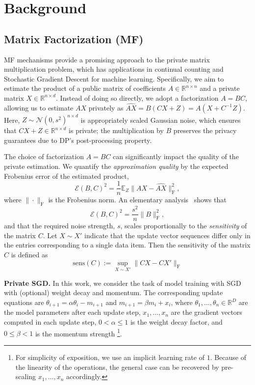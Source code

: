\documentclass{article} %
\newcommand{\R}{\mathbb{R}}
\begin{document}
\section{Background}
\label{sec:background}

\subsection{Matrix Factorization (MF)}
\label{sec:matrix_factorization}
MF mechanisms provide a promising approach to the private matrix multiplication problem, which has applications in continual counting and Stochastic Gradient Descent for machine learning. Specifically, we aim to estimate the product of a public matrix of coefficients $A \in \mathbb{R}^{n\times n}$ and a private matrix $X \in \mathbb{R}^{n \times d}$. Instead of doing so directly, we adopt a factorization $A = BC$, allowing us to estimate $AX$ privately as $\widehat{AX} = B(CX + Z) = A(X + C^{-1}Z)$. Here, $Z \sim \mathcal{N}(0, s^2)^{n \times d}$ is appropriately scaled Gaussian noise, which ensures that $CX + Z \in \mathbb R^{n \times d}$ is private; the multiplication by $B$ preserves the privacy guarantees due to DP's post-processing property. 

The choice of factorization $A = BC$ can significantly impact the quality of the private estimation.  %
%
We quantify the \emph{approximation quality} by the expected Frobenius error of the estimated product, 
\begin{equation}
\mathcal{E}(B,C)^2 = \frac{1}{n}\mathbb{E}_Z \|AX - \widehat{AX}\|_\mathrm{F}^2,\label{eq:approximation_error}
\end{equation}
where $\|\cdot\|_\mathrm{F}$ is the Frobenius norm. An elementary analysis~\citep{Li_MF} shows that 
\begin{equation}
    \mathcal{E}(B,C)^2 = \frac{s^2}{n} \|B\|^2_\mathrm{F},
\end{equation}
and that the required noise strength, $s$, scales proportionally to the \emph{sensitivity} of the matrix $C$. Let $X \sim X'$ indicate that the update vector sequences differ only in the entries corresponding to a single data item. Then the sensitivity of the matrix $C$ is defined as  
\begin{equation}
    \text{sens}(C) := \sup_{X \sim X'} \|CX - CX'\|_\mathrm{F}
\end{equation}


\textbf{Private SGD.} In this work, we consider the task of model training with SGD with (optional) weight decay and momentum.
%
The corresponding update equations are $\theta_{i+1} = \alpha\theta_{i} - m_{i+1}$ and $m_{i+1}=\beta m_i + x_i$, 
where $\theta_1,\dots,\theta_n\in\R^{D}$ are the model parameters after each update step, 
$x_1,\dots,x_n$ are the gradient vectors computed in each update step, $0< \alpha \leq 1$ is the weight decay factor, 
and $0\leq \beta<1$ is the momentum strength
\footnote{For simplicity of exposition, we use an implicit learning rate of $1$. Because of the linearity of the operations, the 
general case can be recovered by pre-scaling $x_1,\dots,x_n$ accordingly.}.
\end{document}

